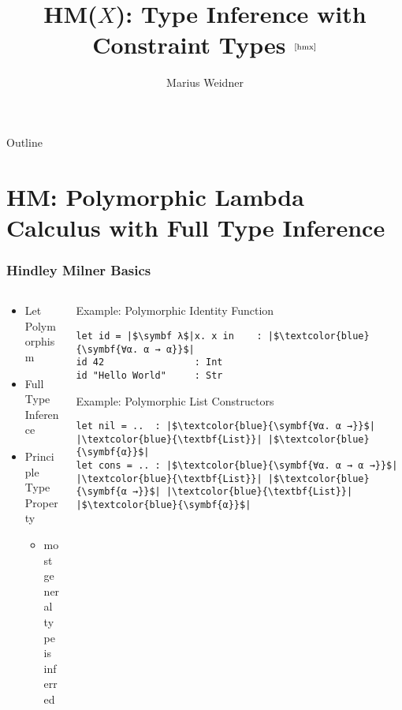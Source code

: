 \documentclass[aspectratio=169]{beamer}
\title{HM($X$): Type Inference with Constraint Types $^{\text{\cite{hmx}}}$}
\institute[Uni Freiburg]{Chair of Programming Languages, University of
  Freiburg}
\author{Marius Weidner}
\begin{document}
\begin{frame}
  \titlepage
\end{frame}

\begin{frame}{Outline}
  \tableofcontents
\end{frame}

\section{HM: Polymorphic Lambda Calculus with Full Type Inference}

\begin{frame}[fragile]
  \frametitle{Hindley Milner Basics}
  \begin{columns}
    \begin{column}{0.38\textwidth}
      \begin{center}
        \begin{itemize}
          \item Let Polymorphism
          \item Full Type Inference
          \item Principle Type Property
                \begin{itemize}
                  \item most general type is inferred
                \end{itemize}
        \end{itemize}
      \end{center}
    \end{column}
    \begin{column}{0.6\textwidth}
      \begin{center}
        \begin{block}{Example: Polymorphic Identity Function}
          \begin{verbatim}
let id = |$\symbf λ$|x. x in    : |$\textcolor{blue}{\symbf{∀α. α → α}}$| 
id 42                : Int
id "Hello World"     : Str
          \end{verbatim}
        \end{block}
      \end{center}
      \begin{center}
        \begin{block}{Example: Polymorphic List Constructors}
          \begin{verbatim}
let nil = ..  : |$\textcolor{blue}{\symbf{∀α. α →}}$| |\textcolor{blue}{\textbf{List}}| |$\textcolor{blue}{\symbf{α}}$| 
let cons = .. : |$\textcolor{blue}{\symbf{∀α. α → α →}}$| |\textcolor{blue}{\textbf{List}}| |$\textcolor{blue}{\symbf{α →}}$| |\textcolor{blue}{\textbf{List}}| |$\textcolor{blue}{\symbf{α}}$| 
          \end{verbatim}
        \end{block}
      \end{center}
    \end{column}
  \end{columns}
\end{frame}
\end{document}
